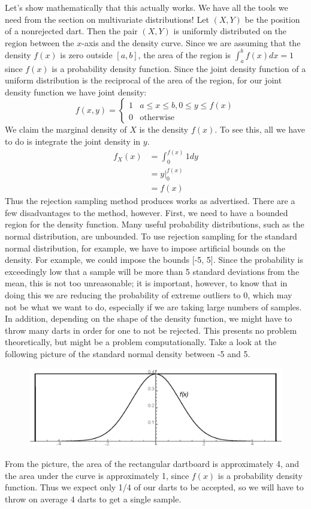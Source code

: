 \documentclass[notes.tex]{subfiles}
\begin{document}
Let's show mathematically that this actually works. We have all the tools we need from the section on multivariate distributions! Let $(X, Y)$ be the position of a nonrejected dart. Then the pair $(X, Y)$ is uniformly distributed on the region between the $x$-axis and the density curve. Since we are assuming that the density $f(x)$ is zero outside $[a, b]$, the area of the region is $\int_a^b f(x) dx = 1$ since $f(x)$ is a probability density function. Since the joint density function of a uniform distribution is the reciprocal of the area of the region, for our joint density function we have joint density:
\[
f(x, y) = \begin{cases}
1 & a \leq x \leq b, 0 \leq y \leq f(x) \\
0 & \text{otherwise}
\end{cases}
\]
We claim the marginal density of $X$ is the density $f(x)$. To see this, all we have to do is integrate the joint density in $y$.
\begin{align*}
f_X(x) &= \int_0^{f(x)} 1 dy \\
&= y\Bigr|_0^{f(x)} \\
&= f(x)
\end{align*}
Thus the rejection sampling method produces works as advertised. There are a few disadvantages to the method, however. First, we need to have a bounded region for the density function. Many useful probability distributions, such as the normal distribution, are unbounded. To use rejection sampling for the standard normal distribution, for example, we have to impose artificial bounds on the density. For example, we could impose the bounds [-5, 5]. Since the probability is exceedingly low that a sample will be more than 5 standard deviations from the mean, this is not too unreasonable; it is important, however, to know that in doing this we are reducing the probability of extreme outliers to 0, which may not be what we want to do, especially if we are taking large numbers of samples. In addition, depending on the shape of the density function, we might have to throw many darts in order for one to not be rejected. This presents no problem theoretically, but might be a problem computationally. Take a look at the following picture of the standard normal density between -5 and 5.
\begin{figure}[H]
\centering
\includegraphics[width=12cm]{rejection2.eps}
\end{figure}
From the picture, the area of the rectangular dartboard is approximately 4, and the area under the curve is approximately 1, since $f(x)$ is a probability density function. Thus we expect only 1/4 of our darts to be accepted, so we will have to throw on average 4 darts to get a single sample.\\
\end{document}
